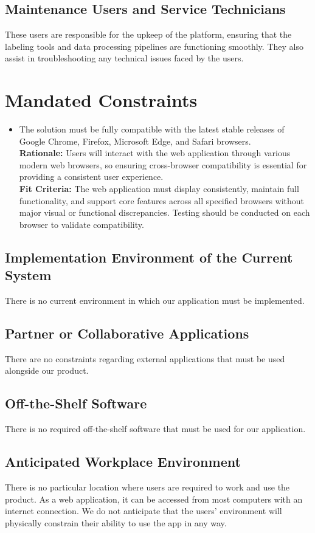 \documentclass[12pt]{article}
\begin{document}
\subsection{Maintenance Users and Service Technicians}
These users are responsible for the upkeep of the platform, ensuring that the labeling tools and data processing pipelines are functioning smoothly. They also assist in troubleshooting any technical issues faced by the users.


\section{Mandated Constraints}
\begin{itemize}
  \item The solution must be fully compatible with the latest stable releases of Google Chrome, Firefox, Microsoft Edge, and Safari browsers.\\ \textbf{Rationale:} Users will interact with the web application through various modern web browsers, so ensuring cross-browser compatibility is essential for providing a consistent user experience. \\ \textbf{Fit Criteria:} The web application must display consistently, maintain full functionality, and support core features across all specified browsers without major visual or functional discrepancies. Testing should be conducted on each browser to validate compatibility.
\end{itemize}
\subsection{Implementation Environment of the Current System}
There is no current environment in which our application must be implemented.
\subsection{Partner or Collaborative Applications}
There are no constraints regarding external applications that must be used alongside our product.
\subsection{Off-the-Shelf Software}
There is no required off-the-shelf software that must be used for our application.
\subsection{Anticipated Workplace Environment}
There is no particular location where users are required to work and use the product. As a web application, it can be accessed from most computers with an internet connection. We do not anticipate that the users' environment will physically constrain their ability to use the app in any way.
\end{document}
